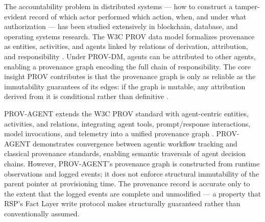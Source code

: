 The accountability problem in distributed systems --- how to construct a tamper-evident record of which actor performed which action, when, and under what authorization --- has been studied extensively in blockchain, database, and operating systems research. The W3C PROV data model formalizes provenance as entities, activities, and agents linked by relations of derivation, attribution, and responsibility \cite{moreau2015-prov}. Under PROV-DM, agents can be attributed to other agents, enabling a provenance graph encoding the full chain of responsibility. The core insight PROV contributes is that the provenance graph is only as reliable as the immutability guarantees of its edges: if the graph is mutable, any attribution derived from it is conditional rather than definitive \cite{moreau2015-prov}.

PROV-AGENT extends the W3C PROV standard with agent-centric entities, activities, and relations, integrating agent tools, prompt/response interactions, model invocations, and telemetry into a unified provenance graph \cite{prov-agent2025}. PROV-AGENT demonstrates convergence between agentic workflow tracking and classical provenance standards, enabling semantic traversals of agent decision chains. However, PROV-AGENT's provenance graph is constructed from runtime observations and logged events; it does not enforce structural immutability of the parent pointer at provisioning time. The provenance record is accurate only to the extent that the logged events are complete and unmodified --- a property that RSP's Fact Layer write protocol makes structurally guaranteed rather than conventionally assumed.

